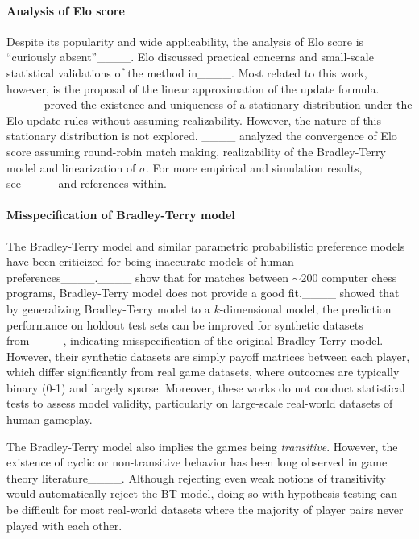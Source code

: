 \paragraph{Analysis of Elo score} Despite its popularity and wide applicability, the analysis of Elo score is ``curiously absent''____.
Elo discussed practical concerns and small-scale statistical validations of the method in____. Most related to this work, however, is the proposal of the linear approximation of the update formula.
____ proved the existence and uniqueness of a stationary distribution under the Elo update rules without assuming realizability. However, the nature of this stationary distribution is not explored.
____ analyzed the convergence of Elo score assuming round-robin match making, realizability of the Bradley-Terry model and linearization of $\sigma$.
For more empirical and simulation results, see____ and references within.


\paragraph{Misspecification of Bradley-Terry model} The Bradley-Terry model and similar parametric probabilistic preference models have been criticized for being inaccurate models of human preferences____.____ show that for matches between $\sim$200 computer chess programs, Bradley-Terry model does not provide a good fit.____ showed that by generalizing Bradley-Terry model to a $k$-dimensional model, the prediction performance on holdout test sets can be improved for synthetic datasets from____, indicating misspecification of the original Bradley-Terry model. However, their synthetic datasets are simply payoff matrices between each player,
which differ significantly from real game datasets, where outcomes are typically binary (0-1) and largely sparse. Moreover, these works do not conduct statistical tests to assess model validity, particularly on large-scale real-world datasets of human gameplay.



The Bradley-Terry model also implies the games being \emph{transitive}. However, the existence of cyclic or non-transitive behavior has been long observed in game theory literature____. Although rejecting even weak notions of transitivity would automatically reject the BT model, doing so with hypothesis testing can be difficult for most real-world datasets where the majority of player pairs never played with each other.

